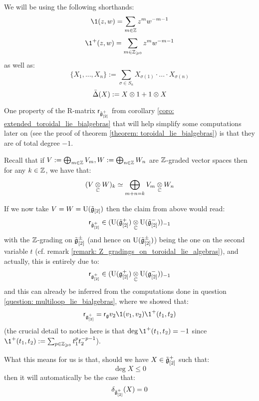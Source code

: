         \begin{convention}
            We will be using the following shorthands:
                $$\1(z, w) = \sum_{m \in \Z} z^m w^{-m - 1}$$
                $$\1^+(z, w) = \sum_{m \in \Z_{\geq 0}} z^m w^{-m - 1}$$
            as well as:
                $$\{ X_1, ..., X_n \} := \sum_{\sigma \in S_n} X_{\sigma(1)} \cdot ... \cdot X_{\sigma(n)}$$
                $$\bar{\Delta}(X) := X \tensor 1 + 1 \tensor X$$
        \end{convention}

        \begin{remark} \label{remark: total_degrees_of_classical_yangian_R_matrices}
            One property of the R-matrix $\mathsf{r}_{\hat{\mathfrak{g}}_{[2]}^+}$ from corollary \ref{coro: extended_toroidal_lie_bialgebras} that will help simplify some computations later on (see the proof of theorem \ref{theorem: toroidal_lie_bialgebras}) is that they are of total degree $-1$. 

            Recall that if $V := \bigoplus_{m \in \mathbb{Z}} V_m, W := \bigoplus_{n \in \mathbb{Z}} W_n$ are $\mathbb{Z}$-graded vector spaces then for any $k \in \mathbb{Z}$, we have that:
                $$(V \tensor_{\bbC} W)_k \cong \bigoplus_{m + n = k} V_m \tensor_{\bbC} W_n$$
                
            If we now take $V = W = \mathrm{U}(\tilde{\mathfrak{g}}_{[2]})$ then the claim from above would read:
                $$\sfr_{\tilde{\g}_{[2]}^+} \in ( \rmU(\tilde{\g}_{[2]}^+) \tensor_{\bbC} \rmU(\tilde{\g}_{[2]}^-) )_{-1}$$
            with the $\mathbb{Z}$-grading on $\tilde{\mathfrak{g}}_{[2]}^{\pm}$ (and hence on $\mathrm{U}(\tilde{\mathfrak{g}}_{[2]}^{\pm})$) being the one on the second variable $t$ (cf. remark \ref{remark: Z_gradings_on_toroidal_lie_algebras}), and actually, this is entirely due to:
                $$\sfr_{\g_{[2]}^+} \in ( \rmU(\g_{[2]}^+) \tensor_{\bbC} \rmU(\g_{[2]}^-) )_{-1}$$
            and this can already be inferred from the computations done in question \ref{question: multiloop_lie_bialgebras}, where we showed that:
                $$\sfr_{\g_{[2]}^+} = \sfr_{\g} v_2 \1(v_1, v_2) \1^+(t_1, t_2)$$
            (the crucial detail to notice here is that $\deg \1^+(t_1, t_2) = -1$ since $\1^+(t_1, t_2) := \sum_{p \in \Z_{\geq 0}} t_1^p t_2^{-p - 1}$).

            What this means for us is that, should we have $X \in \tilde{\mathfrak{g}}_{[2]}^+$ such that:
                $$\deg X \leq 0$$
            then it will automatically be the case that:
                $$\delta_{\tilde{\mathfrak{g}}_{[2]}^+}(X) = 0$$
        \end{remark}
        
